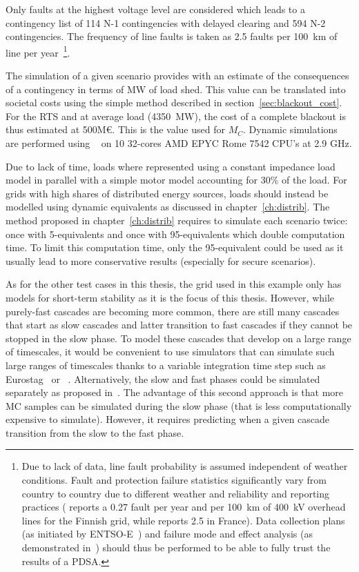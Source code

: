 Only faults at the highest voltage level are considered which leads to a contingency list of 114 N-1 contingencies with delayed clearing and 594 N-2 contingencies. The frequency of line faults is taken as 2.5 faults per 100~km of line per year~\cite{FaultStatisticsFrance}\footnote{Due to lack of data, line fault probability is assumed independent of weather conditions. Fault and protection failure statistics significantly vary from country to country due to different weather and reliability and reporting practices (\eg \cite{GridPSA} reports a 0.27 fault per year and per 100~km of 400~kV overhead lines for the Finnish grid, while \cite{FaultStatisticsFrance} reports 2.5 in France). Data collection plans (as initiated by ENTSO-E~\cite{ENTSOE-PSA}) and failure mode and effect analysis (as demonstrated in~\cite{GridPSA}) should thus be performed to be able to fully trust the results of a PDSA.}.

The simulation of a given scenario provides with an estimate of the consequences of a contingency in terms of MW of load shed. This value can be translated into societal costs using the simple method described in section~\ref{sec:blackout_cost}. For the RTS and at average load (4350~MW), the cost of a complete blackout is thus estimated at 500M€. This is the value used for \(M_C\). Dynamic simulations are performed using \Dynawo{}~\cite{Dynawo} on 10 32-cores AMD EPYC Rome 7542 CPU's at 2.9 GHz.

Due to lack of time, loads where represented using a constant impedance load model in parallel with a simple motor model accounting for 30\% of the load. For grids with high shares of distributed energy sources, loads should instead be modelled using dynamic equivalents as discussed in chapter~\ref{ch:distrib}. The method proposed in chapter~\ref{ch:distrib} requires to simulate each scenario twice: once with 5-equivalents and once with 95-equivalents which double computation time. To limit this computation time, only the 95-equivalent could be used as it usually lead to more conservative results (especially for secure scenarios).

As for the other test cases in this thesis, the grid used in this example only has models for short-term stability as it is the focus of this thesis. However, while purely-fast cascades are becoming more common, there are still many cascades that start as slow cascades and latter transition to fast cascades if they cannot be stopped in the slow phase. To model these cascades that develop on a large range of timescales, it would be convenient to use simulators that can simulate such large ranges of timescales thanks to a variable integration time step such as Eurostag~\cite{STAG} or \Dynawo{}~\cite{Dynawo}. Alternatively, the slow and fast phases could be simulated separately as proposed in~\cite{TwoLevelPSA}. The advantage of this second approach is that more MC samples can be simulated during the slow phase (that is less computationally expensive to simulate). However, it requires predicting when a given cascade transition from the slow to the fast phase.



